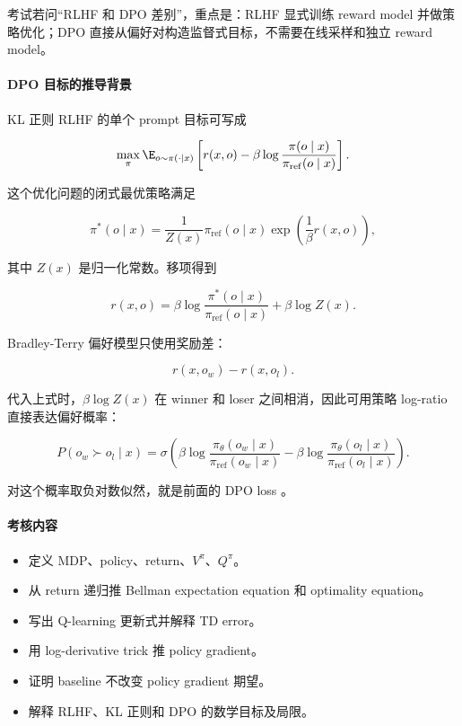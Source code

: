 考试若问“RLHF 和 DPO 差别”，重点是：RLHF 显式训练 reward model 并做策略优化；DPO 直接从偏好对构造监督式目标，不需要在线采样和独立 reward model。

\paragraph{DPO 目标的推导背景}

KL 正则 RLHF 的单个 prompt 目标可写成

\[
  \max_{\pi}
  \E_{o\sim\pi(\cdot\mid x)}
  \left[
    r(x,o)
    -
    \beta
    \log
    \frac{\pi(o\mid x)}{\pi_{\mathrm{ref}}(o\mid x)}
  \right].
\]

这个优化问题的闭式最优策略满足

\[
  \pi^*(o\mid x)
  =
  \frac{1}{Z(x)}
  \pi_{\mathrm{ref}}(o\mid x)
  \exp\left(\frac{1}{\beta}r(x,o)\right),
\]

其中 \(Z(x)\) 是归一化常数。移项得到

\[
  r(x,o)
  =
  \beta
  \log
  \frac{\pi^*(o\mid x)}{\pi_{\mathrm{ref}}(o\mid x)}
  +
  \beta\log Z(x).
\]

Bradley-Terry 偏好模型只使用奖励差：

\[
  r(x,o_w)-r(x,o_l).
\]

代入上式时，\(\beta\log Z(x)\) 在 winner 和 loser 之间相消，因此可用策略 log-ratio 直接表达偏好概率：

\[
  P(o_w\succ o_l\mid x)
  =
  \sigma
  \left(
    \beta
    \log
    \frac{\pi_\theta(o_w\mid x)}{\pi_{\mathrm{ref}}(o_w\mid x)}
    -
    \beta
    \log
    \frac{\pi_\theta(o_l\mid x)}{\pi_{\mathrm{ref}}(o_l\mid x)}
  \right).
\]

对这个概率取负对数似然，就是前面的 DPO loss \parencite{rafailov2023dpo,jurafsky2026slp}。

\paragraph{考核内容}

\begin{itemize}
  \item 定义 MDP、policy、return、\(V^\pi\)、\(Q^\pi\)。
  \item 从 return 递归推 Bellman expectation equation 和 optimality equation。
  \item 写出 Q-learning 更新式并解释 TD error。
  \item 用 log-derivative trick 推 policy gradient。
  \item 证明 baseline 不改变 policy gradient 期望。
  \item 解释 RLHF、KL 正则和 DPO 的数学目标及局限。
\end{itemize}


